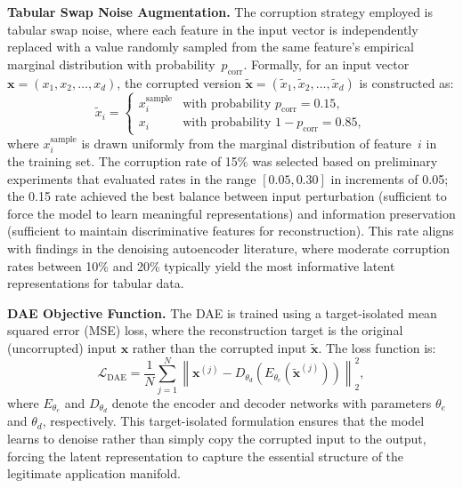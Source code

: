 \textbf{Tabular Swap Noise Augmentation.} The corruption strategy employed is tabular swap noise, where each feature in the input vector is independently replaced with a value randomly sampled from the same feature's empirical marginal distribution with probability~$p_{\text{corr}}$. Formally, for an input vector $\mathbf{x} = (x_1, x_2, \ldots, x_d)$, the corrupted version $\tilde{\mathbf{x}} = (\tilde{x}_1, \tilde{x}_2, \ldots, \tilde{x}_d)$ is constructed as:
\begin{equation}
\tilde{x}_i = \begin{cases} x_i^{\text{sample}} & \text{with probability } p_{\text{corr}} = 0.15, \\ x_i & \text{with probability } 1 - p_{\text{corr}} = 0.85, \end{cases}
\end{equation}
where $x_i^{\text{sample}}$ is drawn uniformly from the marginal distribution of feature~$i$ in the training set. The corruption rate of 15\% was selected based on preliminary experiments that evaluated rates in the range $[0.05, 0.30]$ in increments of 0.05; the 0.15 rate achieved the best balance between input perturbation (sufficient to force the model to learn meaningful representations) and information preservation (sufficient to maintain discriminative features for reconstruction). This rate aligns with findings in the denoising autoencoder literature, where moderate corruption rates between 10\% and 20\% typically yield the most informative latent representations for tabular data.

\textbf{DAE Objective Function.} The DAE is trained using a target-isolated mean squared error (MSE) loss, where the reconstruction target is the original (uncorrupted) input $\mathbf{x}$ rather than the corrupted input $\tilde{\mathbf{x}}$. The loss function is:
\begin{equation}
\mathcal{L}_{\text{DAE}} = \frac{1}{N} \sum_{j=1}^{N} \left\| \mathbf{x}^{(j)} - D_{\theta_d}\!\left(E_{\theta_e}\!\left(\tilde{\mathbf{x}}^{(j)}\right)\right) \right\|^2_2,
\end{equation}
where $E_{\theta_e}$ and $D_{\theta_d}$ denote the encoder and decoder networks with parameters $\theta_e$ and $\theta_d$, respectively. This target-isolated formulation ensures that the model learns to denoise rather than simply copy the corrupted input to the output, forcing the latent representation to capture the essential structure of the legitimate application manifold.

